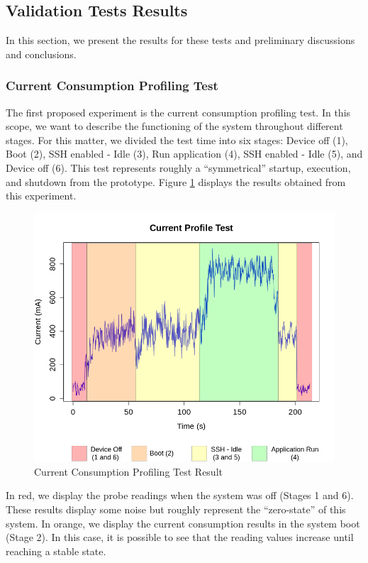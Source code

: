 \subsection{{Validation Tests Results}}

In this section, we present the results for these tests and preliminary discussions and conclusions.

\subsubsection{Current Consumption Profiling Test}

The first proposed experiment is the current consumption profiling test. In this scope, we want to describe the functioning of the system throughout different stages. For this matter, we divided the test time into six stages: Device off (1), Boot (2), SSH enabled - Idle (3), Run application (4), SSH enabled - Idle (5), and Device off (6). This test represents roughly a ``symmetrical'' startup, execution, and shutdown from the prototype. Figure \ref{fig:cptest} displays the results obtained from this experiment.

\begin{figure}[h!]
    \centering
    \includegraphics[width = .8\linewidth]{Figures/cptest-f.png}
    \caption{Current Consumption Profiling Test Result}
    \label{fig:cptest}
\end{figure}

In red, we display the probe readings when the system was off (Stages 1 and 6). These results display some noise but roughly represent the ``zero-state'' of this system. In orange, we display the current consumption results in the system boot (Stage 2). In this case, it is possible to see that the reading values increase until reaching a stable state.

